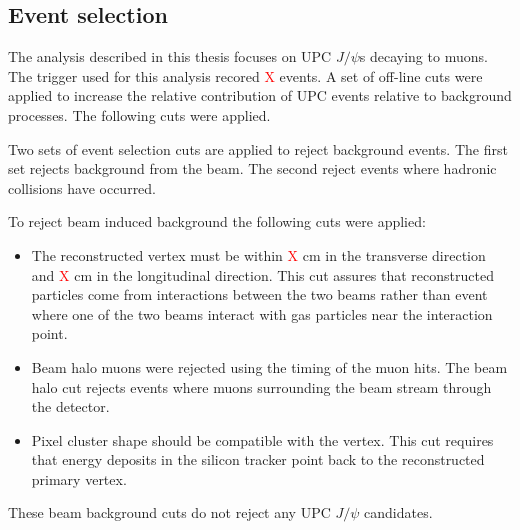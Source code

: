     \subsection{Event selection}
      The analysis described in this thesis focuses on UPC $J/\psi$s decaying to 
        muons. 
      The trigger used for this analysis recored \textcolor{red}{X} events.
      A set of off-line cuts were applied to increase the relative contribution 
        of UPC events relative to background processes. 
      The following cuts were applied. 
  
      Two sets of event selection cuts are applied to reject background events. 
      The first set rejects background from the beam.
      The second reject events where hadronic collisions have occurred.
      
      To reject beam induced background the following cuts were applied:
      \begin{itemize}
        \item The reconstructed vertex must be within \textcolor{red}{X} cm in 
          the transverse direction and \textcolor{red}{X} cm in the 
          longitudinal direction. This cut assures that reconstructed particles 
          come from interactions between the two beams rather than event where 
          one of the two beams interact with gas particles near the interaction 
          point. 
  	    \item Beam halo muons were rejected using the timing of the muon hits.
              The beam halo cut rejects events where muons surrounding the beam 
              stream through the detector. 
  	    \item Pixel cluster shape should be compatible with the vertex. 
          This cut requires that energy deposits in the silicon tracker point 
            back to the reconstructed  primary vertex. 
      \end{itemize}
      These beam background cuts do not reject any UPC $J/\psi$ candidates. 
  
